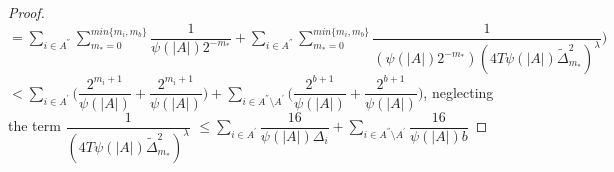 \begin{proof}
\hspace*{0em}$=\sum_{i\in A^{''}}\sum_{m_{*}=0}^{min\lbrace m_{i},m_{b}\rbrace}\dfrac{1}{\psi(|A|)2^{-m_{*}}} + \sum_{i\in A^{''}}\sum_{m_{*}=0}^{min\lbrace m_{i},m_{b}\rbrace}\dfrac{1}{(\psi(|A|)2^{-m_{*}})(4T\psi(|A|)\tilde{\Delta}_{m_{*}}^{2})^{\lambda}})$
\newline
\hspace*{0em}$<\sum_{i\in A^{'}}\bigg(\dfrac{2^{m_{i}+1}}{\psi(|A|)}+\dfrac{2^{m_{i}+1}}{\psi(|A|)}\bigg)+\sum_{i\in A^{''}\setminus A^{'}}\bigg(\dfrac{2^{b+1}}{\psi(|A|)}+\dfrac{2^{b+1}}{\psi(|A|)}\bigg)$, neglecting the term $\dfrac{1}{(4T\psi(|A|)\tilde{\Delta}_{m_{*}}^{2})^{\lambda}}$
\newline
\hspace*{0em}$\leq\sum_{i\in A^{'}}\dfrac{16}{\psi(|A|)\Delta_{i}}+\sum_{i\in A^{''}\setminus A^{'}}\dfrac{16}{\psi(|A|)b}$

\end{proof}
